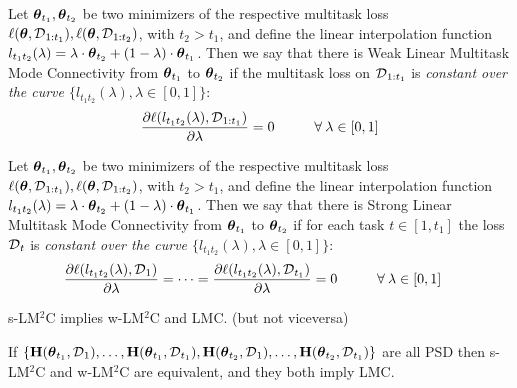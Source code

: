 \documentclass{article} %
\newcommand{\hessian}{\vH}
\begin{document}
\begin{defn}
\label{def:weak-LM2C}
    Let $\mbox{$\mbox{$\boldsymbol{\theta}$}$}_{t_1}, \mbox{$\mbox{$\boldsymbol{\theta}$}$}_{t_2}$ be two minimizers of the respective multitask loss $\ell(\mbox{$\mbox{$\boldsymbol{\theta}$}$}, \mbox{${\cal D}$}_{1:t_1}), \ell(\mbox{$\mbox{$\boldsymbol{\theta}$}$}, \mbox{${\cal D}$}_{1:t_2})$, with $t_2>t_1$, and define the linear interpolation function $l_{t_1t_2}(\lambda) = \lambda\cdot \mbox{$\mbox{$\boldsymbol{\theta}$}$}_{t_2} + (1-\lambda)\cdot \mbox{$\mbox{$\boldsymbol{\theta}$}$}_{t_1}$. Then we say that there is Weak Linear Multitask Mode Connectivity from $\mbox{$\mbox{$\boldsymbol{\theta}$}$}_{t_1}$ to $\mbox{$\mbox{$\boldsymbol{\theta}$}$}_{t_2}$ if the multitask loss on $\mbox{${\cal D}$}_{1:t_1}$ is \emph{constant over the curve $\{l_{t_1t_2}(\lambda), \lambda \in [0,1]\}$}:
\begin{align}
    \frac{\partial{\ell(l_{t_1t_2}(\lambda), \mbox{${\cal D}$}_{1:t_1})}}{\partial{\lambda}} = 0 \hspace{1cm}\forall \:\lambda \in [0,1]
\end{align}
\end{defn}
\vspace{0.2cm}
\begin{defn}
\label{def:strong-LM2C}
    Let $\mbox{$\mbox{$\boldsymbol{\theta}$}$}_{t_1}, \mbox{$\mbox{$\boldsymbol{\theta}$}$}_{t_2}$ be two minimizers of the respective multitask loss $\ell(\mbox{$\mbox{$\boldsymbol{\theta}$}$}, \mbox{${\cal D}$}_{1:t_1}), \ell(\mbox{$\mbox{$\boldsymbol{\theta}$}$}, \mbox{${\cal D}$}_{1:t_2})$, with $t_2>t_1$, and define the linear interpolation function $l_{t_1t_2}(\lambda) = \lambda\cdot \mbox{$\mbox{$\boldsymbol{\theta}$}$}_{t_2} + (1-\lambda)\cdot \mbox{$\mbox{$\boldsymbol{\theta}$}$}_{t_1}$. Then we say that there is Strong Linear Multitask Mode Connectivity from $\mbox{$\mbox{$\boldsymbol{\theta}$}$}_{t_1}$ to $\mbox{$\mbox{$\boldsymbol{\theta}$}$}_{t_2}$ if for each task $t\in [1,t_1]$ the loss $\mbox{${\cal D}$}_{t}$ is \emph{constant over the curve $\{l_{t_1t_2}(\lambda), \lambda \in [0,1]\}$}:
\begin{align}
    &\frac{\partial{\ell(l_{t_1t_2}(\lambda), \mbox{${\cal D}$}_{1})}}{\partial{\lambda}} = \dots = \frac{\partial{\ell(l_{t_1t_2}(\lambda), \mbox{${\cal D}$}_{t_1})}}{\partial{\lambda}} = 0 \hspace{1cm}\forall \:\lambda \in [0,1]
\end{align}
\end{defn}
\vspace{0.2cm}
\begin{corr}
\label{corr:SLM2C-implications}
     s-LM$^2$C implies w-LM$^2$C and LMC. (but not viceversa)
\end{corr}
\vspace{0.2cm}
\begin{corr}
\label{corr:SLM2C-implications2}
     If $\{\hessian(\vparam_{t_1}, \data_{1}),\dots, \hessian(\vparam_{t_1}, \data_{t_1}),\hessian(\vparam_{t_2}, \data_{1}),\dots,\hessian(\vparam_{t_2}, \data_{t_1})\}$  are all PSD then s-LM$^2$C and w-LM$^2$C are equivalent, and they both imply LMC. 
\end{corr}
\end{document}
